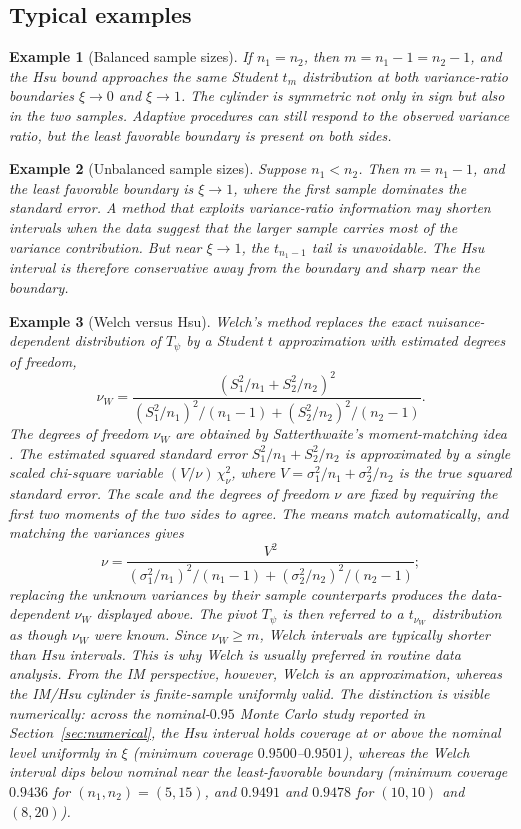 \documentclass[12pt]{article}
\newtheorem{example}{Example}
\begin{document}
\subsection{Typical examples}

\begin{example}[Balanced sample sizes]
If \(n_1=n_2\), then \(m=n_1-1=n_2-1\), and the Hsu bound approaches the same
Student \(t_m\) distribution at both variance-ratio boundaries
\(\xi\to0\) and \(\xi\to1\).  The cylinder is symmetric not only in sign but
also in the two samples.  Adaptive procedures can still respond to the
observed variance ratio, but the least favorable boundary is present on both
sides.
\end{example}

\begin{example}[Unbalanced sample sizes]
Suppose \(n_1<n_2\).  Then \(m=n_1-1\), and the least favorable boundary is
\(\xi\to1\), where the first sample dominates the standard error.  A method
that exploits variance-ratio information may shorten intervals when the data
suggest that the larger sample carries most of the variance contribution.  But
near \(\xi\to1\), the \(t_{n_1-1}\) tail is unavoidable.  The Hsu interval is
therefore conservative away from the boundary and sharp near the boundary.
\end{example}

\begin{example}[Welch versus Hsu]
Welch's method replaces the exact nuisance-dependent distribution of
\(T_\psi\) by a Student \(t\) approximation with estimated degrees of freedom,
\[
\nu_W
=
\frac{(S_1^2/n_1+S_2^2/n_2)^2}
{(S_1^2/n_1)^2/(n_1-1)+(S_2^2/n_2)^2/(n_2-1)}.
\]
The degrees of freedom \(\nu_W\) are obtained by Satterthwaite's
moment-matching idea \citep{Satterthwaite1946}.  The estimated squared standard
error \(S_1^2/n_1+S_2^2/n_2\) is approximated by a single scaled chi-square
variable \((V/\nu)\,\chi^2_\nu\), where \(V=\sigma_1^2/n_1+\sigma_2^2/n_2\) is the
true squared standard error.  The scale and the degrees of freedom \(\nu\) are
fixed by requiring the first two moments of the two sides to agree.  The means
match automatically, and matching the variances gives
\[
\nu
=
\frac{V^2}
{(\sigma_1^2/n_1)^2/(n_1-1)+(\sigma_2^2/n_2)^2/(n_2-1)} ;
\]
replacing the unknown variances by their sample counterparts produces the
data-dependent \(\nu_W\) displayed above.  The pivot \(T_\psi\) is then referred
to a \(t_{\nu_W}\) distribution as though \(\nu_W\) were known.
Since \(\nu_W\geq m\), Welch intervals are typically shorter than Hsu
intervals.  This is why Welch is usually preferred in routine data analysis.
From the IM perspective, however, Welch is an approximation, whereas the
IM/Hsu cylinder is finite-sample uniformly valid.  The distinction is
visible numerically: across the nominal-\(0.95\) Monte Carlo study reported in
Section~\ref{sec:numerical}, the Hsu interval holds coverage at or above the
nominal level uniformly in \(\xi\) (minimum coverage \(0.9500\)--\(0.9501\)),
whereas the Welch interval dips below nominal near the least-favorable boundary
(minimum coverage \(0.9436\) for \((n_1,n_2)=(5,15)\), and \(0.9491\) and
\(0.9478\) for \((10,10)\) and \((8,20)\)).
\end{example}
\end{document}
